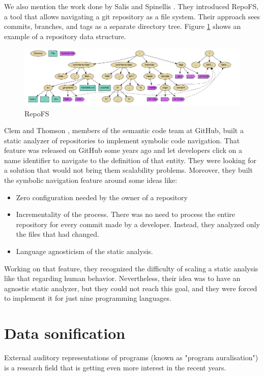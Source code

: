 \bigbreak
We also mention the work done by Salis and Spinellis \cite[]{Salis2019}.
They introduced RepoFS, a tool that allows navigating a git repository as a file system. 
Their approach sees commits, branches, and tags as a separate directory tree. 
Figure \ref{fig:RepoFS} shows an example of a repository data structure. 

\begin{figure}[H]
  \includegraphics[width=0.9\linewidth]{Salis2019.png} 
  \caption{RepoFS}
  \label{fig:RepoFS}
\end{figure}

\bigbreak
Clem and Thomson \cite[]{Clem2021}, members of the semantic code team at GitHub, built a static analyzer of repositories to implement symbolic code navigation. 
That feature was released on GitHub some years ago and let developers click on a name identifier to navigate to the definition of that entity. 
They were looking for a solution that would not bring them scalability problems. 
Moreover, they built the symbolic navigation feature around some ideas like:
\begin{itemize}
  \item Zero configuration needed by the owner of a repository
  \item Incrementality of the process. There was no need to process the entire repository for every commit made by a developer. Instead, they analyzed only the files that had changed. 
  \item Language agnosticism of the static analysis. 
\end{itemize}

Working on that feature, they recognized the difficulty of scaling a static analysis like that regarding human behavior. 
Nevertheless, their idea was to have an agnostic static analyzer, but they could not reach this goal, and they were forced to implement it for just nine programming languages.  

\section{Data sonification}

External auditory representations of programs (known as "program auralisation") is a research field that 
is getting even more interest in the recent years.

